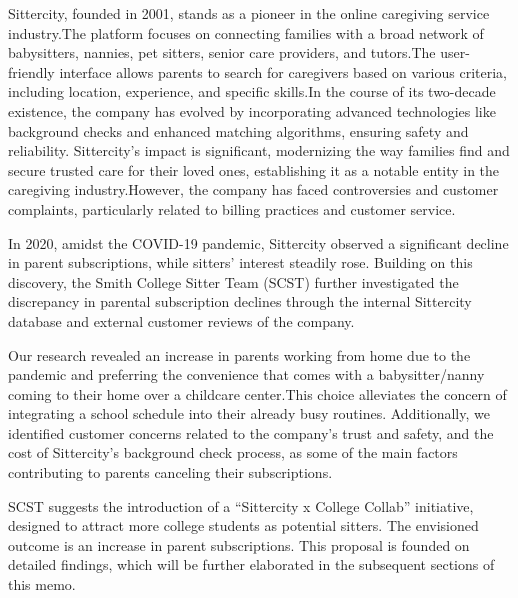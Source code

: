 \documentclass[12pt]{article}
\begin{document}
Sittercity, founded in 2001, stands as a pioneer in the online
caregiving service industry.The platform focuses on connecting families
with a broad network of babysitters, nannies, pet sitters, senior care
providers, and tutors.The user-friendly interface allows parents to
search for caregivers based on various criteria, including location,
experience, and specific skills.In the course of its two-decade
existence, the company has evolved by incorporating advanced
technologies like background checks and enhanced matching algorithms,
ensuring safety and reliability. Sittercity's impact is significant,
modernizing the way families find and secure trusted care for their
loved ones, establishing it as a notable entity in the caregiving
industry.However, the company has faced controversies and customer
complaints, particularly related to billing practices and customer
service.\citep{SitterCityComplaints}

In 2020, amidst the COVID-19 pandemic, Sittercity observed a significant
decline in parent subscriptions, while sitters' interest steadily rose.
Building on this discovery, the Smith College Sitter Team (SCST) further
investigated the discrepancy in parental subscription declines through
the internal Sittercity database and external customer reviews of the
company.

Our research revealed an increase in parents working from home due to
the pandemic and preferring the convenience that comes with a
babysitter/nanny coming to their home over a childcare center.This
choice alleviates the concern of integrating a school schedule into
their already busy routines. Additionally, we identified customer
concerns related to the company's trust and safety, and the cost of
Sittercity's background check process, as some of the main factors
contributing to parents canceling their
subscriptions.\citep{SitterCityBackgroundChecks}

SCST suggests the introduction of a ``Sittercity x College Collab''
initiative, designed to attract more college students as potential
sitters. The envisioned outcome is an increase in parent subscriptions.
This proposal is founded on detailed findings, which will be further
elaborated in the subsequent sections of this memo.
\end{document}
